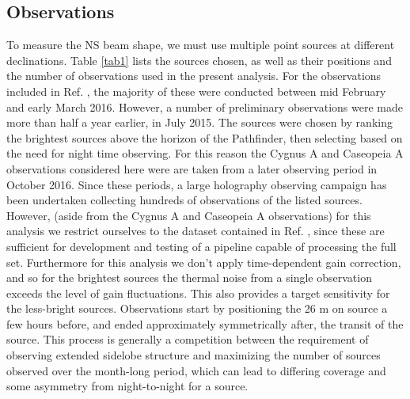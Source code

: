\subsection{Observations} \label{ch:hol:sec:io:ss:o}

To measure the NS beam shape, we must use multiple point sources at different declinations. Table \ref{tab1} lists the sources chosen, as well as their positions and the number of observations used in the present analysis. For the observations included in Ref. \citep{bergernewburgh}, the majority of these were conducted between mid February and early March 2016. However, a number of preliminary observations were made more than half a year earlier, in July 2015. The sources were chosen by ranking the brightest sources above the horizon of the Pathfinder, then selecting based on the need for night time observing. For this reason the Cygnus A and Caseopeia A observations considered here were are taken from a later observing period in October 2016. Since these periods, a large holography observing campaign has been undertaken collecting hundreds of observations of the listed sources. However, (aside from the Cygnus A and Caseopeia A observations) for this analysis we restrict ourselves to the dataset contained in Ref. \citep{bergernewburgh}, since these are sufficient for development and testing of a pipeline capable of processing the full set. Furthermore for this analysis we don't apply time-dependent gain correction, and so for the brightest sources the thermal noise from a single observation exceeds the level of gain fluctuations. This also provides a target sensitivity for the less-bright sources. Observations start by positioning the 26 m on source a few hours before, and ended approximately symmetrically after, the transit of the source. This process is generally a competition between the requirement of observing extended sidelobe structure and maximizing the number of sources observed over the month-long period, which can lead to differing coverage and some asymmetry from night-to-night for a source.

